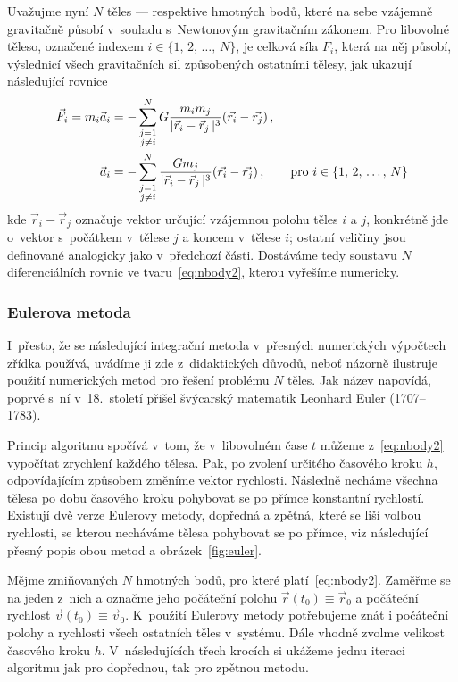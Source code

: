\documentclass[A4paper, 12pt, oneside]{book}
\begin{document}
Uvažujme nyní $N$ těles --- respektive hmotných bodů, které na sebe vzájemně gravitačně působí v~souladu s~Newtonovým gravitačním zákonem. Pro libovolné těleso, označené indexem $i\in\{1,\,2,\,\dots,\,N\}$, je celková síla $F_i$, která na něj působí, výslednicí všech gravitačních sil způsobených ostatními tělesy, jak ukazují následující rovnice
\begin{align} 
	\vec{F}_i = m_i\vec{a}_i &= -\sum_{\substack{j=1 \\ j\neq i}}^N G\frac{m_im_j}{\lvert \vec{r}_i-\vec{r}_j \,\rvert^3}(\vec{r_i}-\vec{r_j})\,, \label{eq:nbody1} \\
		\vec{a}_i &= -\sum_{\substack{j=1 \\ j\neq i}}^N \frac{Gm_j}{\lvert \vec{r}_i-\vec{r}_j \,\rvert^3}(\vec{r_i}-\vec{r_j})\,, \qquad{\rm pro}\ i\in\{1,\,2,\,\dots,\,N\} \label{eq:nbody2}
\end{align}
kde $\vec{r}_i-\vec{r}_j$ označuje vektor určující vzájemnou polohu těles $i$ a $j$, konkrétně jde o~vektor s~počátkem v~tělese $j$ a koncem v~tělese $i$; ostatní veličiny jsou definované analogicky jako v~předchozí části. Dostáváme tedy soustavu $N$ diferenciálních rovnic ve tvaru~\eqref{eq:nbody2}, kterou vyřešíme numericky.
\subsubsection{Eulerova metoda}\label{sec:euler}
I~přesto, že se následující integrační metoda v~přesných numerických výpočtech zřídka používá, uvádíme ji zde z~didaktických důvodů, neboť názorně ilustruje použití numerických metod pro řešení problému $N$ těles. Jak název napovídá, poprvé s~ní v~18.\ století přišel švýcarský matematik Leonhard Euler (1707--1783).

Princip algoritmu spočívá v~tom, že v~libovolném čase $t$ můžeme z~\eqref{eq:nbody2} vypočítat zrychlení každého tělesa. Pak, po zvolení určitého časového kroku $h$, odpovídajícím způsobem změníme vektor rychlosti. Následně necháme všechna tělesa po dobu časového kroku pohybovat se po přímce konstantní rychlostí. Existují dvě verze Eulerovy metody, dopředná a zpětná, které se liší volbou rychlosti, se kterou necháváme tělesa pohybovat se po přímce, viz následující přesný popis obou metod a obrázek~\ref{fig:euler}.

Mějme zmiňovaných $N$ hmotných bodů, pro které platí~\eqref{eq:nbody2}. Zaměřme se na jeden z~nich a označme jeho počáteční polohu $\vec{r}(t_0)\equiv\vec{r}_0$ a počáteční rychlost $\vec{v}(t_0)\equiv\vec{v}_0$. K~použití Eulerovy metody potřebujeme znát i počáteční polohy a rychlosti všech ostatních těles v~systému. Dále vhodně zvolme velikost časového kroku $h$. V~následujících třech krocích si ukážeme jednu iteraci algoritmu jak pro dopřednou, tak pro zpětnou metodu.
\end{document}
